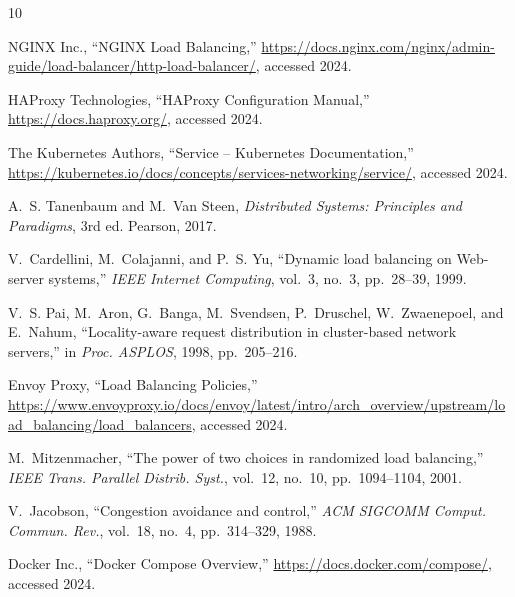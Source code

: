 \documentclass[conference]{IEEEtran}
\begin{document}
\begin{thebibliography}{10}

NGINX Inc., ``NGINX Load Balancing,''
\url{https://docs.nginx.com/nginx/admin-guide/load-balancer/http-load-balancer/},
accessed 2024.

HAProxy Technologies, ``HAProxy Configuration Manual,''
\url{https://docs.haproxy.org/}, accessed 2024.

The Kubernetes Authors, ``Service -- Kubernetes Documentation,''
\url{https://kubernetes.io/docs/concepts/services-networking/service/},
accessed 2024.

A.~S. Tanenbaum and M.~Van Steen,
\textit{Distributed Systems: Principles and Paradigms}, 3rd ed.
Pearson, 2017.

V.~Cardellini, M.~Colajanni, and P.~S. Yu,
``Dynamic load balancing on Web-server systems,''
\textit{IEEE Internet Computing}, vol.~3, no.~3, pp.~28--39, 1999.

V.~S. Pai, M.~Aron, G.~Banga, M.~Svendsen, P.~Druschel,
W.~Zwaenepoel, and E.~Nahum,
``Locality-aware request distribution in cluster-based network servers,''
in \textit{Proc. ASPLOS}, 1998, pp.~205--216.

Envoy Proxy, ``Load Balancing Policies,''
\url{https://www.envoyproxy.io/docs/envoy/latest/intro/arch_overview/upstream/load_balancing/load_balancers},
accessed 2024.

M.~Mitzenmacher,
``The power of two choices in randomized load balancing,''
\textit{IEEE Trans. Parallel Distrib. Syst.}, vol.~12, no.~10,
pp.~1094--1104, 2001.

V.~Jacobson,
``Congestion avoidance and control,''
\textit{ACM SIGCOMM Comput. Commun. Rev.}, vol.~18, no.~4,
pp.~314--329, 1988.

Docker Inc., ``Docker Compose Overview,''
\url{https://docs.docker.com/compose/}, accessed 2024.

\end{thebibliography}
\end{document}
